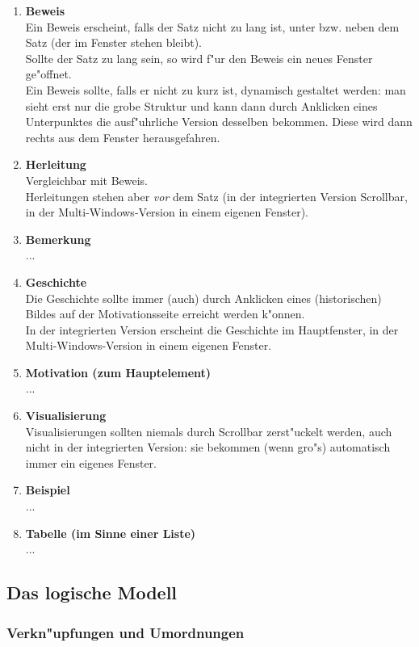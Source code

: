 	\begin{enumerate}
	\item \textbf{Beweis}\\
	Ein Beweis erscheint, falls der Satz nicht zu lang ist,
	unter bzw. neben dem Satz (der im Fenster
	stehen bleibt). \\
	Sollte der Satz zu lang sein, so wird f"ur den Beweis ein
	neues Fenster ge"offnet.\\
	Ein Beweis sollte, falls er nicht zu kurz ist, dynamisch gestaltet werden:
	man sieht erst nur die grobe Struktur und kann dann durch Anklicken eines
	Unterpunktes die ausf"uhrliche Version desselben bekommen.
	Diese wird dann rechts aus dem Fenster herausgefahren.
	\item \textbf{Herleitung}\\
	Vergleichbar mit Beweis.\\
	Herleitungen stehen aber \textit{vor} dem Satz (in der integrierten 
	Version Scrollbar, in der Multi-Windows-Version in einem eigenen Fenster).
	\item \textbf{Bemerkung}\\	
	...
	\item \textbf{Geschichte}\\
	Die Geschichte sollte immer (auch) durch Anklicken
        eines (historischen) Bildes auf der Motivationsseite
        erreicht werden k"onnen.\\
	In der integrierten Version erscheint die Geschichte im Hauptfenster, 
	in der Multi-Windows-Version in einem eigenen Fenster.
	\item \textbf{Motivation (zum Hauptelement)}\\
	...
	\item \textbf{Visualisierung}\\
	Visualisierungen sollten niemals durch Scrollbar zerst"uckelt werden,	
	auch nicht in der integrierten Version: sie bekommen (wenn gro"s)
	automatisch immer ein eigenes Fenster. 
	\item \textbf{Beispiel}\\
	...
	\item \textbf{Tabelle (im Sinne einer Liste)}\\
	...
	\end{enumerate}


\subsection{Das logische Modell}

\subsubsection{Verkn"upfungen und Umordnungen}

